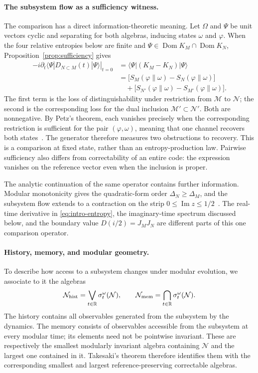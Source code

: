 \documentclass[a4paper,11pt]{article}
\theoremstyle{definition}
\begin{document}
\paragraph{The subsystem flow as a sufficiency witness.}
The comparison has a direct information-theoretic meaning. Let $\Omega$ and $\Psi$ be unit vectors cyclic and separating for both algebras, inducing states $\omega$ and $\varphi$. When the four relative entropies below are finite and $\Psi\in\operatorname{Dom}K_M\cap\operatorname{Dom}K_N$, Proposition~\ref{prop:sufficiency} gives
\begin{align}
 -i\left.\partial_t\langle\Psi|D_{N\subset M}(t)|\Psi\rangle\right|_{t=0}
 &=\langle\Psi|(K_M-K_N)|\Psi\rangle\nonumber\\
 &=\bigl[S_M(\varphi\|\omega)-S_N(\varphi\|\omega)\bigr]\nonumber\\
 &\quad+\bigl[S_{N'}(\varphi\|\omega)-S_{M'}(\varphi\|\omega)\bigr].
 \label{eq:intro-entropy}
\end{align}
The first term is the loss of distinguishability under restriction from $\mathcal M$ to $\mathcal N$; the second is the corresponding loss for the dual inclusion $\mathcal M'\subset\mathcal N'$. Both are nonnegative. By Petz's theorem, each vanishes precisely when the corresponding restriction is sufficient for the pair $(\varphi,\omega)$, meaning that one channel recovers both states~\cite{Petz1986,Petz1988}. The generator therefore measures two obstructions to recovery. This is a comparison at fixed state, rather than an entropy-production law. Pairwise sufficiency also differs from correctability of an entire code: the expression vanishes on the reference vector even when the inclusion is proper.

The analytic continuation of the same operator contains further information. Modular monotonicity gives the quadratic-form order $\Delta_N\ge\Delta_M$, and the subsystem flow extends to a contraction on the strip $0\le\operatorname{Im}z\le1/2$~\cite{revolutionizing}. The real-time derivative in \eqref{eq:intro-entropy}, the imaginary-time spectrum discussed below, and the boundary value $D(i/2)=J_MJ_N$ are different parts of this one comparison operator.

\paragraph{History, memory, and modular geometry.}
To describe how access to a subsystem changes under modular evolution, we associate to it the algebras
\begin{equation}
 \mathcal N_{\rm hist}=\bigvee_{t\in\mathbb R}\sigma_t^\omega(\mathcal N),
 \qquad
 \mathcal N_{\rm mem}=\bigcap_{t\in\mathbb R}\sigma_t^\omega(\mathcal N).
\end{equation}
The history contains all observables generated from the subsystem by the dynamics. The memory consists of observables accessible from the subsystem at every modular time; its elements need not be pointwise invariant. These are respectively the smallest modularly invariant algebra containing $\mathcal N$ and the largest one contained in it. Takesaki's theorem therefore identifies them with the corresponding smallest and largest reference-preserving correctable algebras.
\end{document}
